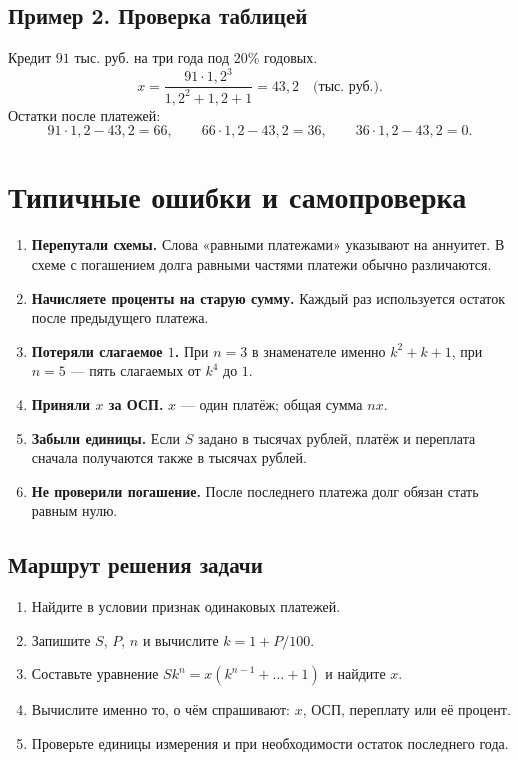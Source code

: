 \documentclass[a4paper,12pt]{article}
\begin{document}
\subsection{Пример 2. Проверка таблицей}
Кредит \(91\) тыс. руб. на три года под \(20\%\) годовых.
\[
 x=\frac{91\cdot1{,}2^3}{1{,}2^2+1{,}2+1}=43{,}2\quad\text{(тыс. руб.)}.
\]
Остатки после платежей:
\[
91\cdot1{,}2-43{,}2=66,\qquad
66\cdot1{,}2-43{,}2=36,\qquad
36\cdot1{,}2-43{,}2=0.
\]

\clearpage
\section{Типичные ошибки и самопроверка}
\begin{enumerate}[itemsep=7pt]
\item \textbf{Перепутали схемы.} Слова «равными платежами» указывают на аннуитет. В схеме с погашением долга равными частями платежи обычно различаются.
\item \textbf{Начисляете проценты на старую сумму.} Каждый раз используется остаток после предыдущего платежа.
\item \textbf{Потеряли слагаемое \(1\).} При \(n=3\) в знаменателе именно \(k^2+k+1\), при \(n=5\) --- пять слагаемых от \(k^4\) до \(1\).
\item \textbf{Приняли \(x\) за ОСП.} \(x\) --- один платёж; общая сумма \(nx\).
\item \textbf{Забыли единицы.} Если \(S\) задано в тысячах рублей, платёж и переплата сначала получаются также в тысячах рублей.
\item \textbf{Не проверили погашение.} После последнего платежа долг обязан стать равным нулю.
\end{enumerate}

\subsection{Маршрут решения задачи}
\begin{enumerate}[itemsep=4pt]
\item Найдите в условии признак одинаковых платежей.
\item Запишите \(S\), \(P\), \(n\) и вычислите \(k=1+P/100\).
\item Составьте уравнение \(Sk^n=x(k^{n-1}+\ldots+1)\) и найдите \(x\).
\item Вычислите именно то, о чём спрашивают: \(x\), ОСП, переплату или её процент.
\item Проверьте единицы измерения и при необходимости остаток последнего года.
\end{enumerate}
\end{document}
